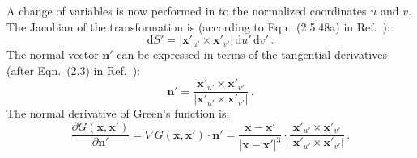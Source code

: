 A change of variables is now performed in  to the normalized coordinates $u$ and $v$.
The Jacobian of the transformation is (according to Eqn.~(2.5.48a) in Ref.~\cite{dHaseleer}):
\begin{equation}
  \mathrm{d}S' = |\mathbf{x}'_{u'} \times \mathbf{x}'_{v'}| \,\mathrm{d}u' \,\mathrm{d}v' \, . \label{eqn:surfaceJacobian}
\end{equation}
The normal vector $\mathbf{n}'$ can be expressed in terms of the tangential derivatives (after Eqn.~(2.3) in Ref.~\cite{merkel_1987}):
\begin{equation}
  \mathbf{n}' = \frac{\mathbf{x}'_{u'} \times \mathbf{x}'_{v'}}{|\mathbf{x}'_{u'} \times \mathbf{x}'_{v'}|} \, . \label{eqn:normalVector}
\end{equation}
The normal derivative of Green's function is:
\begin{equation}
    \frac{\partial G(\mathbf{x},\mathbf{x}')}{\partial \mathbf{n}'}
  = \nabla G(\mathbf{x},\mathbf{x}') \cdot \mathbf{n}'
  = \frac{\mathbf{x}-\mathbf{x}'}{|\mathbf{x}-\mathbf{x}'|^3} \cdot \frac{\mathbf{x}'_{u'} \times \mathbf{x}'_{v'}}{|\mathbf{x}'_{u'} \times \mathbf{x}'_{v'}|} \, . \label{eqn:normalGreensFunction}
\end{equation}

\FloatBarrier
